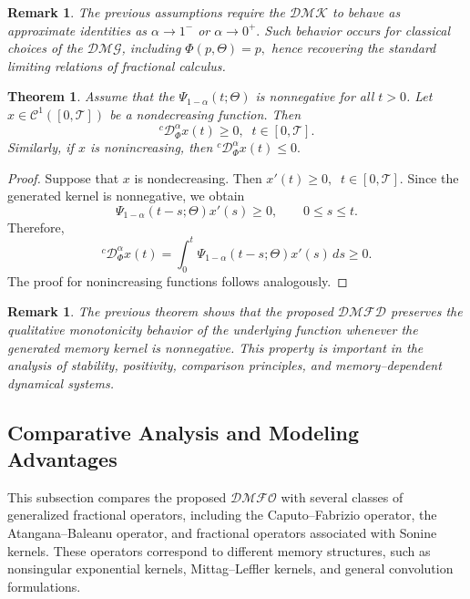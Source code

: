 \documentclass[11pt]{article}
\numberwithin{equation}{section}
\newtheorem{theorem}[definition]{Theorem}
\newtheorem{remark}[definition]{Remark}
\begin{document}
\begin{remark}
The previous assumptions require the $\mathcal{DMK}$ to behave as approximate identities as
\(
\alpha\to1^-
\)
or
\(
\alpha\to0^+.
\)
Such behavior occurs for classical choices of the $\mathcal{DMG}$, including
\(
\Phi(p,\Theta)=p,
\)
hence recovering the standard limiting relations of fractional calculus.
\end{remark}


\begin{theorem}
Assume that the 
\(
\Psi_{1-\alpha}(t;\Theta)
\)
is nonnegative for all \(t>0\). Let
\(
x\in \mathcal{C}^{1}([0,\mathcal{T}])
\)
be a nondecreasing function. Then
\[
{}^{c} \mathcal D_{\Phi}^{\alpha}x(t)\ge0,
\;\; t\in[0,\mathcal{T}].
\]
Similarly, if \(x\) is nonincreasing, then
\(
{}^{c} \mathcal D_{\Phi}^{\alpha}x(t)\le 0.
\)
\end{theorem}

\begin{proof}
Suppose that \(x\) is nondecreasing. Then
\(
x'(t)\ge0,
\;\; t\in[0,\mathcal{T}].
\)
Since the generated kernel is nonnegative, we obtain
\[
\Psi_{1-\alpha}(t-s;\Theta)x'(s)\ge0,
\qquad 0\le s\le t.
\]
Therefore,
\[
{}^{c} \mathcal D_{\Phi}^{\alpha}x(t)
=
\int_{0}^{t}
\Psi_{1-\alpha}(t-s;\Theta)x'(s)\,ds
\ge0.
\]
The proof for nonincreasing functions follows analogously.
\end{proof}


\begin{remark}
The previous theorem shows that the proposed $\mathcal{DMFD}$ preserves
the qualitative monotonicity behavior of the underlying function whenever the generated memory
kernel is nonnegative. This property is important in the analysis of stability, positivity,
comparison principles, and memory--dependent dynamical systems.
\end{remark}


\subsection{Comparative Analysis and Modeling Advantages}

This subsection compares the proposed $\mathcal{DMFO}$ with several classes of generalized fractional operators, including the Caputo--Fabrizio operator, the Atangana--Baleanu operator, and fractional operators associated with Sonine kernels. These operators correspond to different memory structures, such as nonsingular exponential kernels, Mittag--Leffler kernels, and general convolution formulations.
\end{document}
